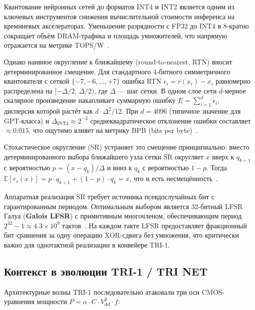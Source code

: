 
Квантование нейронных сетей до форматов INT4 и INT2 является одним
из ключевых инструментов снижения вычислительной стоимости
инференса на кремниевых акселераторах.  Уменьшение разрядности
с FP32 до INT4 в 8-кратно сокращает объём DRAM-трафика и площадь
умножителей, что напрямую отражается на метрике
TOPS/W~\cite{hubara2018}.

Однако наивное округление к ближайшему (round-to-nearest, RTN)
вносит детерминированное смещение.  Для стандартного 4-битного
симметричного квантователя с сеткой $\{-7,-6,\ldots,+7\}$
ошибка RTN $\epsilon_i = r(x_i) - x_i$ равномерно распределена на
$[-\Delta/2,\, \Delta/2)$, где $\Delta$ — шаг сетки.  В одном
слое сети $d$-мерное скалярное произведение накапливает суммарную
ошибку $E = \sum_{i=1}^d \epsilon_i$, дисперсия которой растёт как
$d \cdot \Delta^2/12$.  При $d = 4096$ (типичное значение для
GPT-класса) и $\Delta_{\text{INT4}} \approx 2^{-3}$
среднеквадратическое отклонение ошибки составляет $\approx 0{.}015$,
что ощутимо влияет на метрику BPB (bits per byte)~\cite{gholami2022survey}.

Стохастическое округление (SR) устраняет это смещение принципиально:
вместо детерминированного выбора ближайшего узла сетки SR
округляет $x$ вверх к $q_{k+1}$ с вероятностью
$p = (x - q_k)/\Delta$ и вниз к $q_k$ с вероятностью $1-p$.
Тогда $\mathbb{E}[r_s(x)] = p \cdot q_{k+1} + (1-p) \cdot q_k = x$,
что и есть несмещённость~\cite{gupta2015}.

Аппаратная реализация SR требует источника псевдослучайных бит
с гарантированным периодом.  Оптимальным выбором является
32-битный LFSR Галуа (\textbf{Galois LFSR}) с примитивным
многочленом, обеспечивающим период $2^{32}-1 \approx 4{.}3 \times 10^9$
тактов~\cite{micikevicius2017mixed}.  На каждом такте LFSR
предоставляет фракционный бит сравнения за одну операцию XOR-сдвига
без умножения, что критически важно для однотактной реализации
в конвейере TRI-1.

\subsection{Контекст в эволюции TRI-1 / TRI NET}
\label{ssec:glava88-context}

Архитектурные волны TRI-1 последовательно атаковали три оси
CMOS-уравнения мощности $P = \alpha \cdot C \cdot V_{\mathrm{dd}}^2 \cdot f$:

